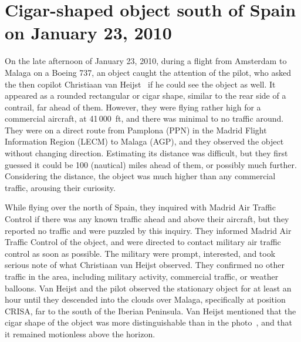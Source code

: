\clearpage




\section{Cigar-shaped object south of Spain on January 23,  2010}
\label{2023-UFO-part-History-photos-2010-csssp}

On the late afternoon of January 23, 2010, during a flight from Amsterdam to Malaga on a Boeing 737, an object caught
the attention of the pilot, who asked the then copilot Christiaan van Heijst~\cite{vanHeijst2010Jan,Heijst2023Feb}
if he could see the object as well.
It appeared as a rounded rectangular or cigar shape, similar to the rear side of a contrail, far ahead of them.
However, they were flying rather high for a commercial aircraft, at 41\,000~ft,
and there was minimal to no traffic around.
They were on a direct route from Pamplona (PPN) in the Madrid Flight Information Region (LECM) to Malaga (AGP),
and they observed the object without changing direction.
Estimating its distance was difficult, but they first guessed it could be 100 (nautical) miles ahead of them,
or possibly much further.
Considering the distance, the object was much higher than any commercial traffic, arousing their curiosity.

While flying over the north of Spain, they inquired with Madrid Air Traffic Control
if there was any known traffic ahead and above their aircraft, but they reported no traffic and were puzzled by this inquiry.
They informed Madrid Air Traffic Control of the object, and were directed to contact military air traffic control as soon as possible.
The military were prompt, interested, and took serious note of what Christiaan van Heijst observed.
They confirmed no other traffic in the area, including military activity, commercial traffic, or weather balloons.
Van Heijst and the pilot observed the stationary object for at least an hour until they descended into the clouds over Malaga,
specifically at position CRISA, far to the south of the Iberian Peninsula.
Van Heijst mentioned that the cigar shape of the object was more distinguishable than in the photo~\cite{vanHeijst2010Jan},
and that it remained motionless above the horizon.


